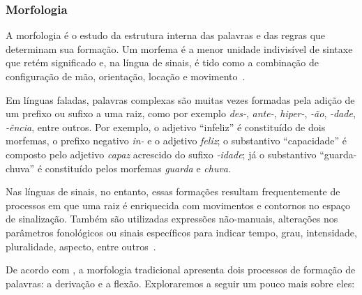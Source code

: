 \subsubsection{Morfologia}
\label{linguistica-gramatica-morfologia}

A morfologia é o estudo da estrutura interna das palavras e das regras que determinam sua formação. Um morfema é a menor unidade indivisível de sintaxe que retém significado e, na língua de sinais, é tido como a combinação de configuração de mão, orientação, locação e movimento~\cite{quadros-2004-estudos-linguisticos,jay-2011-dont-just-sign,hill-2019-sign-languages}.



Em línguas faladas, palavras complexas são muitas vezes formadas pela adição de um prefixo ou sufixo a uma raiz, como por exemplo \textit{des-}, \textit{ante-}, \textit{hiper-}, \textit{-ão}, \textit{-dade}, \textit{-ência}, entre outros. Por exemplo, o adjetivo ``infeliz'' é constituído de dois morfemas, o prefixo negativo \textit{in-} e o adjetivo \textit{feliz}; o substantivo ``capacidade'' é composto pelo adjetivo \textit{capaz} acrescido do sufixo \textit{-idade}; já o substantivo ``guarda-chuva'' é constituído pelos morfemas \textit{guarda} e \textit{chuva}.

Nas línguas de sinais, no entanto, essas formações resultam frequentemente de processos em que uma raiz é enriquecida com movimentos e contornos no espaço de sinalização. Também são utilizadas expressões não-manuais, alterações nos parâmetros fonológicos ou sinais específicos para indicar tempo, grau, intensidade, pluralidade, aspecto, entre outros~\cite{klima-1975-wit-poetry-asl,quadros-2004-estudos-linguisticos}.

De acordo com , a morfologia tradicional apresenta dois processos de formação de palavras: a derivação e a flexão. Exploraremos a seguir um pouco mais sobre eles:

